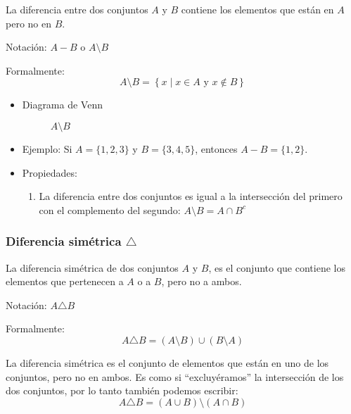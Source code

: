 \vspace{1em}

\begin{fmd-definition}[Diferencia]
	La diferencia entre dos conjuntos \(A\) y \(B\) contiene los elementos que están en \(A\) pero no en \(B\).
	
	Notación: \(A - B\) o \( A \setminus B \)
	
	Formalmente:
	\[ A \setminus B = \left\{ x \mid x \in A \mbox{ y } x \not \in B \right\} \]
\end{fmd-definition}

\begin{itemize}
	\item Diagrama de Venn
	\begin{figure}[H]
		\centering
		\begin{venndiagram2sets}
			\fillOnlyA
		\end{venndiagram2sets}
		\caption*{$A \setminus B$}
	\end{figure}
	\item Ejemplo:
	Si \(A = \{1, 2, 3\}\) y \(B = \{3, 4, 5\}\), entonces \(A - B = \{1, 2\}\).
	\item Propiedades:
	\begin{enumerate}[label=\roman*)]
		\item La diferencia entre dos conjuntos es igual a la intersección del primero con el complemento del segundo: \( A \setminus B = A \cap B^c \)
	\end{enumerate}
\end{itemize}

\subsubsection{Diferencia simétrica $\triangle$}
\vspace{1em}

\begin{fmd-definition}
	La diferencia simétrica de dos conjuntos \(A\) y \(B\), es el conjunto que contiene los elementos que pertenecen a \(A\) o a \(B\), pero no a ambos.
	
	Notación: \(A \triangle B\)
	
	Formalmente:
	$$A \triangle B = (A \setminus B) \cup (B \setminus A)$$
	
	La diferencia simétrica es el conjunto de elementos que están en uno de los conjuntos, pero no en ambos. Es como si ``excluyéramos'' la intersección de los dos conjuntos, por lo tanto también podemos escribir:
	\[ A \triangle B = \left( A \cup B \right) \setminus \left( A \cap B \right) \]
\end{fmd-definition}

